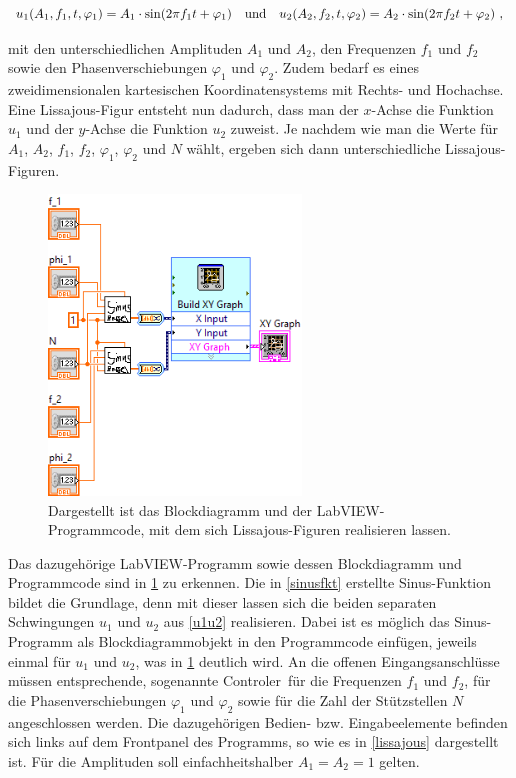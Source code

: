 \documentclass[
a4paper,
12pt,
pagesize,
ngerman
]{scrartcl}
\begin{document}
	\begin{equation} \label{u1u2}
	u_1(A_1,f_1,t,\varphi_1) = A_1 \cdot \sin(2\pi f_1 t + \varphi_1) \ \ \ \textnormal{und} \ \ \ u_2(A_2,f_2,t,\varphi_2) = A_2 \cdot \sin(2\pi f_2 t + \varphi_2) \ ,
	\end{equation}
	
	\noindent mit den unterschiedlichen Amplituden $A_1$ und $A_2$, den Frequenzen $f_1$ und $f_2$ sowie den Phasenverschiebungen $\varphi_1$ und $\varphi_2$. Zudem bedarf es eines zweidimensionalen kartesischen Koordinatensystems mit Rechts- und Hochachse. Eine Lissajous-Figur entsteht nun dadurch, dass man der $x$-Achse die Funktion $u_1$ und der $y$-Achse die Funktion $u_2$ zuweist. Je nachdem wie man die Werte für $A_1$, $A_2$, $f_1$, $f_2$, $\varphi_1$, $\varphi_2$ und $N$ wählt, ergeben sich dann unterschiedliche Lissajous-Figuren.
	
	\begin{figure}[H]
		\centering
		\includegraphics[width=0.6\textwidth]{EIRE2018Dateien/Tag1/lissajous-bilder/Lissajousd}
		\caption{Dargestellt ist das Blockdiagramm und der LabVIEW-Programmcode, mit dem sich Lissajous-Figuren realisieren lassen.}
		\label{lissajousprogrammcode}
	\end{figure}

	\noindent Das dazugehörige LabVIEW-Programm sowie dessen Blockdiagramm und Programmcode sind in \cref{lissajousprogrammcode} zu erkennen. Die in \cref{sinusfkt} erstellte Sinus-Funktion bildet die Grundlage, denn mit dieser lassen sich die beiden separaten Schwingungen $u_1$ und $u_2$ aus \cref{u1u2} realisieren. Dabei ist es möglich das Sinus-Programm als Blockdiagrammobjekt in den Programmcode einfügen, jeweils einmal für $u_1$ und $u_2$, was in \cref{lissajousprogrammcode} deutlich wird. An die offenen Eingangsanschlüsse müssen entsprechende, sogenannte \glqq Controler\grqq\ für die Frequenzen $f_1$ und $f_2$, für die Phasenverschiebungen $\varphi_1$ und $\varphi_2$ sowie für die Zahl der Stützstellen $N$ angeschlossen werden. Die dazugehörigen Bedien- bzw. Eingabeelemente befinden sich links auf dem Frontpanel des Programms, so wie es in \cref{lissajous} dargestellt ist. Für die Amplituden soll einfachheitshalber $A_1 = A_2 = 1$ gelten.
\end{document}
